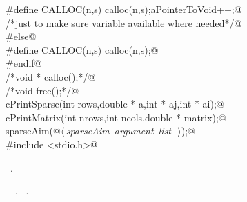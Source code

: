\documentclass{article}
\begin{document}
\begin{flushleft}
\begin{minipage}{\linewidth}
\begin{list}{}{}
\mbox{}\verb@#define CALLOC(n,s) calloc(n,s);aPointerToVoid++;@\\
\mbox{}\verb@/*just to make sure variable available where needed*/@\\
\mbox{}\verb@#else@\\
\mbox{}\verb@#define CALLOC(n,s) calloc(n,s);@\\
\mbox{}\verb@#endif@\\
\mbox{}\verb@/*void * calloc();*/@\\
\mbox{}\verb@/*void free();*/@\\
\mbox{}\verb@void cPrintSparse(int rows,double * a,int * aj,int * ai);@\\
\mbox{}\verb@void cPrintMatrix(int nrows,int ncols,double * matrix);@\\
\mbox{}\verb@void sparseAim(@\hbox{$\langle\,${\itshape sparseAim argument list}\nobreak\ {\footnotesize {}}$\,\rangle$}\verb@);@\\
\mbox{}\verb@#include <stdio.h>@\\
\mbox{}\verb@@{\NWsep}
\end{list}
\vspace{-1.5ex}
\footnotesize
\begin{list}{}{\setlength{\itemsep}{-\parsep}\setlength{\itemindent}{-\leftmargin}}
\item \NWtxtFileDefBy\ .
\item \NWtxtIdentsUsed\nobreak\  \verb@bumpSparseAim@\nobreak\ , \verb@maxHElementsEncountered@\nobreak\ .
\item{}
\end{list}
\end{minipage}\vspace{4ex}
\end{flushleft}
\end{document}
